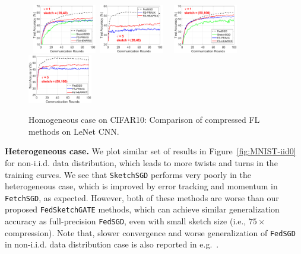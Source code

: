 \documentclass[sigconf, anonymous, review]{acmart}
\begin{document}
\begin{figure}[t]
	\begin{center}
		\mbox{%
		\includegraphics[width=0.25\textwidth]{CIFAR_figures/cifar_local1_sketch20_iid1_test_acc.eps}  
		 \includegraphics[width=0.25\textwidth]{CIFAR_figures/cifar_local5_sketch20_iid1_test_acc.eps}
		}
		\mbox{%
	\includegraphics[width=0.25\textwidth]{CIFAR_figures/cifar_local1_sketch50_iid1_test_acc.eps} 
		\includegraphics[width=0.25\textwidth]{CIFAR_figures/cifar_local5_sketch50_iid1_test_acc.eps}
		}
	\end{center}
	\caption{Homogeneous case on CIFAR10: Comparison of compressed FL methods on LeNet CNN.}
    \label{fig:CIFAR-homog}
\end{figure}



\vspace{0.05in}
\noindent\textbf{Heterogeneous case.} We plot similar set of results in Figure~\ref{fig:MNIST-iid0} for non-i.i.d. data distribution, which leads to more twists and turns in the training curves. 
We see that \texttt{SketchSGD} performs very poorly in the heterogeneous case, which is improved by error tracking and momentum in \texttt{FetchSGD}, as expected. 
However, both of these methods are worse than our proposed \texttt{FedSketchGATE} methods, which can achieve similar generalization accuracy as full-precision \texttt{FedSGD}, even with small sketch size (i.e., $75\times$ compression). 
Note that, slower convergence and worse generalization of \texttt{FedSGD} in non-i.i.d. data distribution case is also reported in e.g.~\citep{mcmahan2016communication,chen2020toward}. 
\end{document}
